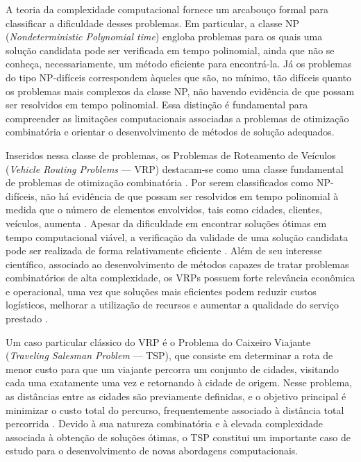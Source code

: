 A teoria da complexidade computacional fornece um arcabouço formal para classificar a dificuldade desses problemas. Em particular, a classe NP (\textit{Nondeterministic Polynomial time}) engloba problemas para os quais uma solução candidata pode ser verificada em tempo polinomial, ainda que não se conheça, necessariamente, um método eficiente para encontrá-la. Já os problemas do tipo NP-difíceis correspondem àqueles que são, no mínimo, tão difíceis quanto os problemas mais complexos da classe NP, não havendo evidência de que possam ser resolvidos em tempo polinomial. Essa distinção é fundamental para compreender as limitações computacionais associadas a problemas de otimização combinatória e orientar o desenvolvimento de métodos de solução adequados. \cite{sipser1996introduction}

Inseridos nessa classe de problemas, os Problemas de Roteamento de Veículos (\textit{Vehicle Routing Problems} — VRP) destacam-se como uma classe fundamental de problemas de otimização combinatória \cite{psaraftis1995dynamic, laporte1992vehicle, Heidelberg2008travelingsalesmanperson}. Por serem classificados como NP-difíceis, não há evidência de que possam ser resolvidos em tempo polinomial à medida que o número de elementos envolvidos, tais como cidades, clientes, veículos, aumenta \cite{karp2009reducibility}. Apesar da dificuldade em encontrar soluções ótimas em tempo computacional viável, a verificação da validade de uma solução candidata pode ser realizada de forma relativamente eficiente \cite{sipser1996introduction, lenstra1981complexity}. Além de seu interesse científico, associado ao desenvolvimento de métodos capazes de tratar problemas combinatórios de alta complexidade, os VRPs possuem forte relevância econômica e operacional, uma vez que soluções mais eficientes podem reduzir custos logísticos, melhorar a utilização de recursos e aumentar a qualidade do serviço prestado \cite{dantzig1959truck,toth2002vehicle}. 

Um caso particular clássico do VRP é o Problema do Caixeiro Viajante (\textit{Traveling Salesman Problem} — TSP), que consiste em determinar a rota de menor custo para que um viajante percorra um conjunto de cidades, visitando cada uma exatamente uma vez e retornando à cidade de origem. Nesse problema, as distâncias entre as cidades são previamente definidas, e o objetivo principal é minimizar o custo total do percurso, frequentemente associado à distância total percorrida \cite{dantzig1954solution, applegate2011traveling}. Devido à sua natureza combinatória e à elevada complexidade associada à obtenção de soluções ótimas, o TSP constitui um importante caso de estudo para o desenvolvimento de novas abordagens computacionais.

